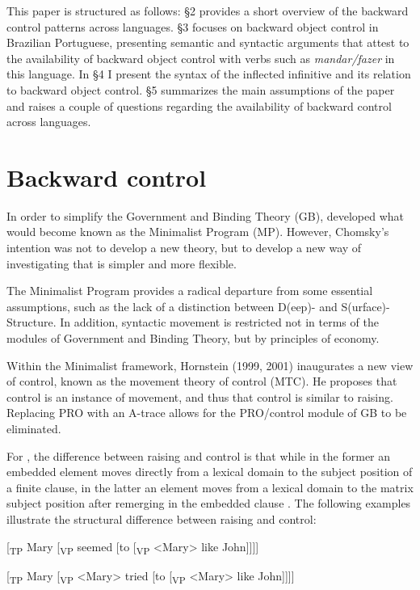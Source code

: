 \documentclass[output=paper]{langsci/langscibook}
\begin{document}
This paper is structured as follows: §2 provides a short overview of the backward control patterns across languages. §3 focuses on backward object control in Brazilian Portuguese, presenting semantic and syntactic arguments that attest to the availability of backward object control with verbs such as \textit{mandar/fazer} in this language. In §4 I present the syntax of the inflected infinitive and its relation to backward object control. §5 summarizes the main assumptions of the paper and raises a couple of questions regarding the availability of backward control across languages.

\section{Backward control}%

In order to simplify the Government and Binding Theory (GB), \citet{Chomsky1993} developed what would become known as the Minimalist Program (MP). However, Chomsky’s intention was not to develop a new theory, but to develop a new way of investigating that is simpler and more flexible.

The Minimalist Program provides a radical departure from some essential assumptions, such as the lack of a distinction between D(eep)- and S(urface)-Structure. In addition, syntactic movement is restricted not in terms of the modules of Government and Binding Theory, but by principles of economy. 

Within the Minimalist framework, Hornstein (1999, 2001) inaugurates a new view of control, known as the movement theory of control (MTC). He proposes that control is an instance of movement, and thus that control is similar to raising. Replacing PRO with an A-trace allows for the PRO/control module of GB to be eliminated.

For \citet{Hornstein1999}, the difference between raising and control is that while in the former an embedded element moves directly from a lexical domain to the subject position of a finite clause, in the latter an element moves from a lexical domain to the matrix subject position after remerging in the embedded clause \citep{Boeckx2006}. The following examples illustrate the structural difference between raising and control:

\ea%
    \label{ex:moreno:3}
[\textsubscript{TP} Mary [\textsubscript{VP} seemed [to [\textsubscript{VP} <Mary> like John]]]]
\z

\ea%
\label{ex:moreno:4}
[\textsubscript{TP} Mary [\textsubscript{VP} <Mary> tried [to [\textsubscript{VP} <Mary> like John]]]]
\z
\end{document}
